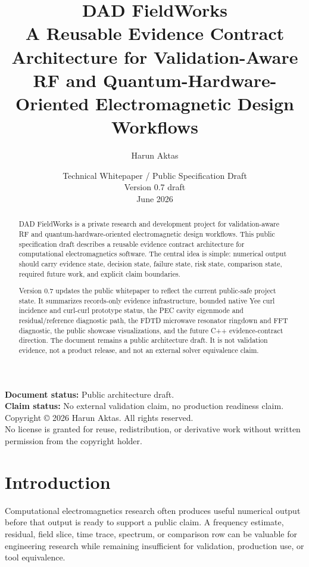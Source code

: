 \documentclass[11pt,a4paper]{article}
\title{\textbf{DAD FieldWorks}\\
{\large A Reusable Evidence Contract Architecture for Validation-Aware RF and Quantum-Hardware-Oriented Electromagnetic Design Workflows}}
\author{Harun Aktas}
\date{Technical Whitepaper / Public Specification Draft\\Version 0.7 draft\\June 2026}
\begin{document}
\maketitle

\begin{center}
\textbf{Document status:} Public architecture draft.\\
\textbf{Claim status:} No external validation claim, no production readiness claim.\\
Copyright \copyright{} 2026 Harun Aktas. All rights reserved.\\
No license is granted for reuse, redistribution, or derivative work without written permission from the copyright holder.
\end{center}

\newpage

\begin{abstract}
DAD FieldWorks is a private research and development project for validation-aware RF and quantum-hardware-oriented electromagnetic design workflows. This public specification draft describes a reusable evidence contract architecture for computational electromagnetics software. The central idea is simple: numerical output should carry evidence state, decision state, failure state, risk state, comparison state, required future work, and explicit claim boundaries.

Version 0.7 updates the public whitepaper to reflect the current public-safe project state. It summarizes records-only evidence infrastructure, bounded native Yee curl incidence and curl-curl prototype status, the PEC cavity eigenmode and residual/reference diagnostic path, the FDTD microwave resonator ringdown and FFT diagnostic, the public showcase visualizations, and the future C++ evidence-contract direction. The document remains a public architecture draft. It is not validation evidence, not a product release, and not an external solver equivalence claim.
\end{abstract}

\tableofcontents
\newpage

\section{Introduction}

Computational electromagnetics research often produces useful numerical output before that output is ready to support a public claim. A frequency estimate, residual, field slice, time trace, spectrum, or comparison row can be valuable for engineering research while remaining insufficient for validation, production use, or tool equivalence.
\end{document}
